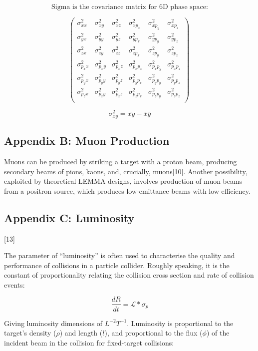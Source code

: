 \documentclass{article}
\begin{document}
	
	$$\textrm{Sigma is the covariance matrix for $6$D phase space:}$$
	
	$$\left( \begin{array}{cccccc}
		\sigma_{xx}^2 & \sigma_{xy}^2 & \sigma_{xz}^2 & \sigma_{xp_x}^2 & \sigma_{xp_y}^2 & \sigma_{xp_z}^2 \\
		\sigma_{yx}^2 & \sigma_{yy}^2 & \sigma_{yz}^2 & \sigma_{yp_x}^2 & \sigma_{yp_y}^2 & \sigma_{yp_z}^2 \\
		\sigma_{zx}^2 & \sigma_{zy}^2 & \sigma_{zz}^2 & \sigma_{zp_x}^2 & \sigma_{zp_y}^2 & \sigma_{zp_z}^2 \\
		\sigma_{p_xx}^2 & \sigma_{p_xy}^2 & \sigma_{p_xz}^2 & \sigma_{p_xp_x}^2 & \sigma_{p_xp_y}^2 & \sigma_{p_xp_z}^2 \\
		\sigma_{p_yx}^2 & \sigma_{p_yy}^2 & \sigma_{p_yz}^2 & \sigma_{p_yp_x}^2 & \sigma_{p_yp_y}^2 & \sigma_{p_yp_z}^2 \\
		\sigma_{p_zx}^2 & \sigma_{p_zy}^2 & \sigma_{p_zz}^2 & \sigma_{p_zp_x}^2 & \sigma_{p_zp_y}^2 & \sigma_{p_zp_z}^2 \\
	\end{array} \right)\ $$
	
	$$\sigma_{xy}^2 = \overline{xy} -\bar{x}\bar{y}$$
	
	
	
	\subsection{Appendix B: Muon Production}
	\par Muons can be produced by striking a target with a proton beam, producing secondary beams of pions, kaons, and, crucially, muons[10]. Another possibility, exploited by theoretical LEMMA designs, involves production of muon beams from a positron source, which produces low-emittance beams with low efficiency.
	
	
	\subsection{Appendix C: Luminosity}[13]
	\par The parameter of “luminosity” is often used to characterise the quality and performance of collisions in a particle collider. Roughly speaking, it is the constant of proportionality relating the collision cross section and rate of collision events:
	
	$$\frac{dR}{dt} = \mathcal{L} * \sigma_p$$
	
	\par Giving luminosity dimensions of $L^{-2}T^{-1}$. Luminosity is proportional to the target’s density ($\rho$) and length ($l$), and proportional to the flux ($\phi$) of the incident beam in the collision for fixed-target collisions:
	
\end{document}
